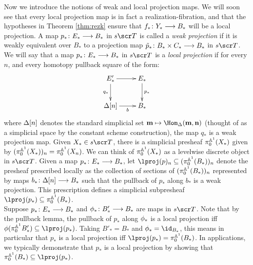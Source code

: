 \documentclass{amsart}
\theoremstyle{definition}
\newcommand{\bm}{\mathbf{m}}
\newcommand{\bn}{\mathbf{n}}
\begin{document}
Now we introduce the notions of weak and local projection maps. We will soon see that every local projection map is in fact a realization-fibration, and that the hypotheses in Theorem \ref{thm:rezk} ensure that $f_* \colon Y_* \longrightarrow B_*$ will be a local projection.
A map $p_* \colon E_* \longrightarrow B_*$ in $s\sT$ is called a \emph{weak projection} if it is weakly equivalent over $B_*$ to a projection map $\tilde{p}_* \colon B_* \times C_* \longrightarrow B_*$ in $s\sT$. We will say that a map $p_* \colon E_* \longrightarrow B_*$ in $s\sT$ is a \emph{local projection} if for every 
$n$, and every homotopy pullback square of the form:
\[
\xymatrix{
    E'_* \ar[r] \ar[d]_-{q_*} & E_* \ar[d]^-{p_*}\\
    \DE[n] \ar[r]_-{b} & B_*
}
\]
\noindent where $\Delta[n]$ denotes the standard simplicial set $\bm \mapsto \Hom_{\DE}(\bm,\bn)$ (thought of as a simplicial space by the constant scheme construction), the map $q_*$ is a weak projection map. Given $X_* \in s\sT$, there is a simplicial presheaf $\pi_0^{\mathbb{A}^1}(X_*)$ given by $(\pi_0^{\mathbb{A}^1} (X_*))_n = \pi_0^{\mathbb{A}^1} (X_n)$. We can think of $\pi_0^{\mathbb{A}^1}(X_*)$ as a levelwise discrete object in $s\sT$. Given a map $p_* \colon E_* \longrightarrow B_*$, 
let $\lproj(p)_n \subseteq (\pi_0^{\bA^1}(B_*))_n$ denote the presheaf prescribed locally as the collection of sections of $(\pi_0^{\mathbb{A}^1}(B_*))_n$ represented by maps $b_* \colon \Delta[n] \longrightarrow B_*$ such that the pullback of $p_*$ along $b_*$ is a weak projection. This prescription defines a simplicial subpresheaf $\lproj(p_*) \subseteq \pi_0^{\bA^1}(B_*)$.\\

Suppose $p_* \colon E_* \longrightarrow B_*$ and $\phi_* \colon B'_* \longrightarrow B_*$ are maps in $s\sT$. Note that by the pullback lemma, the pullback of $p_*$ along $\phi_*$ is a local projection iff $\ph(\pi_0^{\bA^1} B'_*) \subseteq \lproj(p_*)$. Taking $B'_*=B_*$ and $\ph_* = \id_{B_*}$, this means in particular that $p_*$ is a local projection iff $\lproj(p_*) = \pi_0^{\bA^1} (B_*)$. In applications, we typically demonstrate that $p_*$ is a local projection by showing that 
$\pi_0^{\bA^1} (B_*) \subseteq \lproj(p_*)$. 
\end{document}
